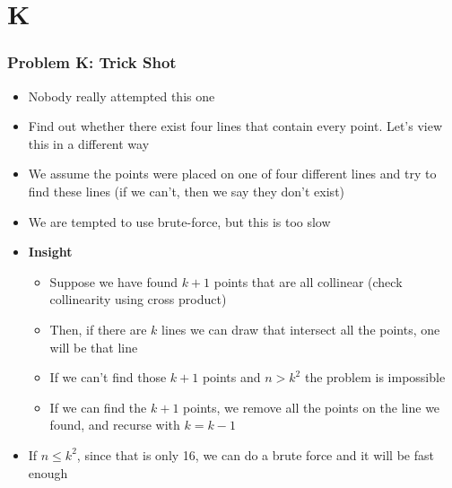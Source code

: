 \section{K}%
\label{sec:k}

\begin{frame}
  \frametitle{Problem K: Trick Shot}

  \begin{itemize}
    \item Nobody really attempted this one
    \item Find out whether there exist four lines that contain every point. Let's view this in a different way
    \item We assume the points were placed on one of four different lines and try to find these lines (if we can't, then we say they don't exist)
    \item We are tempted to use brute-force, but this is too slow
    \item \textbf{Insight} \begin{itemize}
      \item Suppose we have found $k+1$ points that are all collinear (check collinearity using cross product)
      \item Then, if there are $k$ lines we can draw that intersect all the points, one will be that line
      \item If we can't find those $k+1$ points and $n > k^2$ the problem is impossible
      \item If we can find the $k+1$ points, we remove all the points on the line we found, and recurse with $k = k-1$
    \end{itemize}
    \item If $n \le k^2$, since that is only 16, we can do a brute force and it will be fast enough
  \end{itemize}

\end{frame}

